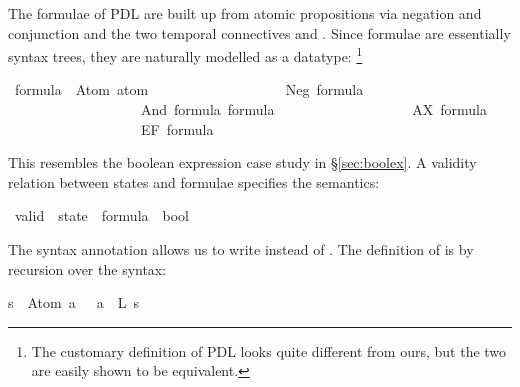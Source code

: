 %
\begin{isabellebody}%
\def\isabellecontext{PDL}%
%
\isadelimtheory
%
\endisadelimtheory
%
\isatagtheory
\isamarkupfalse%
%
\endisatagtheory
{\isafoldtheory}%
%
\isadelimtheory
%
\endisadelimtheory
%
\isamarkuptrue%
%
\begin{isamarkuptext}%
The formulae of PDL are built up from atomic propositions via
negation and conjunction and the two temporal
connectives  and \@. Since formulae are essentially
syntax trees, they are naturally modelled as a datatype:%
\footnote{The customary definition of PDL
\cite{HarelKT-DL} looks quite different from ours, but the two are easily
shown to be equivalent.}%
\end{isamarkuptext}%
\isamarkuptrue%
\isamarkupfalse%
\ formula\ {\isacharequal}\ Atom\ atom\isanewline
\ \ \ \ \ \ \ \ \ \ \ \ \ \ \ \ \ \ {\isacharbar}\ Neg\ formula\isanewline
\ \ \ \ \ \ \ \ \ \ \ \ \ \ \ \ \ \ {\isacharbar}\ And\ formula\ formula\isanewline
\ \ \ \ \ \ \ \ \ \ \ \ \ \ \ \ \ \ {\isacharbar}\ AX\ formula\isanewline
\ \ \ \ \ \ \ \ \ \ \ \ \ \ \ \ \ \ {\isacharbar}\ EF\ formula%
\begin{isamarkuptext}%
\noindent
This resembles the boolean expression case study in
\S\ref{sec:boolex}.
A validity relation between
states and formulae specifies the semantics:%
\end{isamarkuptext}%
\isamarkuptrue%
\isamarkupfalse%
\ valid\ {\isacharcolon}{\isacharcolon}\ {\isachardoublequoteopen}state\ {\isasymRightarrow}\ formula\ {\isasymRightarrow}\ bool{\isachardoublequoteclose}\ \ \ {\isacharparenleft}{\isachardoublequoteopen}{\isacharparenleft}{\isacharunderscore}\ {\isasymTurnstile}\ {\isacharunderscore}{\isacharparenright}{\isachardoublequoteclose}\ {\isacharbrackleft}{}{}{\isacharcomma}{}{}{\isacharbrackright}\ {}{}{\isacharparenright}%
\begin{isamarkuptext}%
\noindent
The syntax annotation allows us to write  instead of
\hbox{}.
The definition of \isa{{\isasymTurnstile}} is by recursion over the syntax:%
\end{isamarkuptext}%
\isamarkuptrue%
\isamarkupfalse%
\isanewline
{\isachardoublequoteopen}s\ {\isasymTurnstile}\ Atom\ a\ \ {\isacharequal}\ {\isacharparenleft}a\ {\isasymin}\ L\ s{\isacharparenright}{\isachardoublequoteclose}\isanewline

\end{isabellebody}
